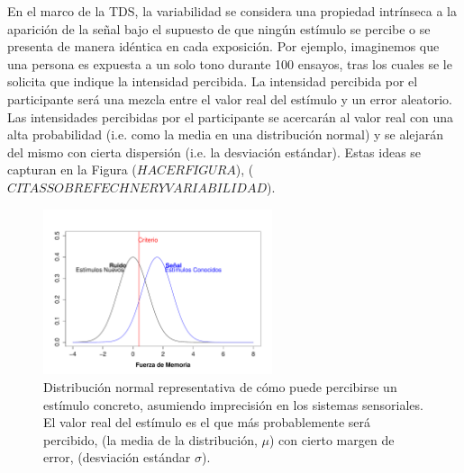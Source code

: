 \begin{itemize}
\begin{itemize}
En el marco de la TDS, la variabilidad se considera una propiedad intrínseca a la aparición de la señal bajo el supuesto de que ningún estímulo se percibe o se presenta de manera idéntica en cada exposición. Por ejemplo, imaginemos que una persona es expuesta a un solo tono durante 100 ensayos, tras los cuales se le solicita que indique la intensidad percibida. La intensidad percibida por el participante será una mezcla entre el valor real del estímulo y un error aleatorio. Las intensidades percibidas por el participante se acercarán al valor real con una alta probabilidad (i.e. como la media en una distribución normal) y se alejarán del mismo con cierta dispersión (i.e. la desviación estándar). Estas ideas se capturan en la Figura ($HACER FIGURA$), ($CITAS SOBRE FECHNER Y VARIABILIDAD$).\\

\begin{figure}[th]
\centering
\includegraphics[width=0.60\textwidth]{Figures/RM_SDT_1} 
\caption[Variabilidad en la percepción de la señal]{Distribución normal representativa de cómo puede percibirse un estímulo concreto, asumiendo imprecisión en los sistemas sensoriales. El valor real del estímulo es el que más probablemente será percibido, (la media de la distribución, $\mu$) con cierto margen de error, (desviación estándar $\sigma$).}
\label{fig:Senal_percepcion}
\end{figure}


\end{itemize}
\end{itemize}
